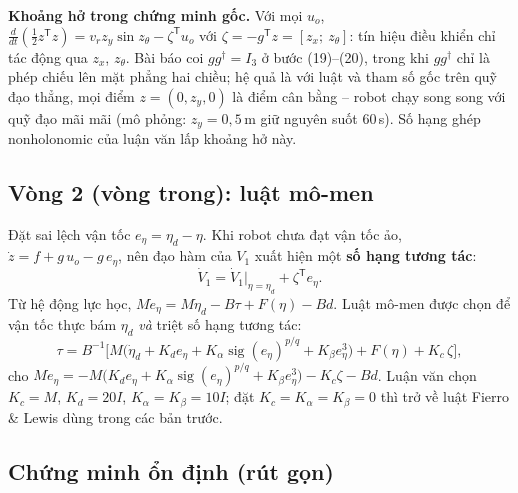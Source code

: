 \documentclass[12pt,a4paper]{article}
\newcommand{\T}{\mathsf{T}}
\begin{document}
\textbf{Khoảng hở trong chứng minh gốc.} Với mọi $u_o$, $\frac{d}{dt}(\frac12 z^\T z) = v_r z_y\sin z_\theta - \zeta^\T u_o$ với $\zeta = -g^\T z = [z_x;\ z_\theta]$: tín hiệu điều khiển chỉ tác động qua $z_x$, $z_\theta$. Bài báo coi $g g^\dagger = I_3$ ở bước (19)--(20), trong khi $gg^\dagger$ chỉ là phép chiếu lên mặt phẳng hai chiều; hệ quả là với luật và tham số gốc trên quỹ đạo thẳng, mọi điểm $z = (0, z_y, 0)$ là điểm cân bằng -- robot chạy song song với quỹ đạo mãi mãi (mô phỏng: $z_y = 0{,}5$\,m giữ nguyên suốt 60\,s). Số hạng ghép nonholonomic của luận văn lấp khoảng hở này.

\subsection{Vòng 2 (vòng trong): luật mô-men}

Đặt sai lệch vận tốc $e_\eta = \eta_d - \eta$. Khi robot chưa đạt vận tốc ảo, $\dot z = f + g\,u_o - g\,e_\eta$, nên đạo hàm của $V_1$ xuất hiện một \textbf{số hạng tương tác}:
\begin{equation}
    \dot V_1 = \dot V_1\big|_{\eta = \eta_d} + \zeta^\T e_\eta .
\end{equation}
Từ hệ động lực học, $M\dot e_\eta = M\dot\eta_d - B\tau + F(\eta) - Bd$. Luật mô-men được chọn để vận tốc thực bám $\eta_d$ \textit{và} triệt số hạng tương tác:
\begin{equation}
    \tau = B^{-1}\Big[M\big(\dot\eta_d + K_d e_\eta + K_\alpha\operatorname{sig}(e_\eta)^{p/q} + K_\beta e_\eta^3\big) + F(\eta) + K_c\,\zeta\Big],
\end{equation}
cho $M\dot e_\eta = -M\big(K_d e_\eta + K_\alpha\operatorname{sig}(e_\eta)^{p/q} + K_\beta e_\eta^3\big) - K_c\zeta - Bd$. Luận văn chọn $K_c = M$, $K_d = 20I$, $K_\alpha = K_\beta = 10I$; đặt $K_c = K_\alpha = K_\beta = 0$ thì trở về luật Fierro \& Lewis dùng trong các bản trước.

\subsection{Chứng minh ổn định (rút gọn)}
\end{document}
